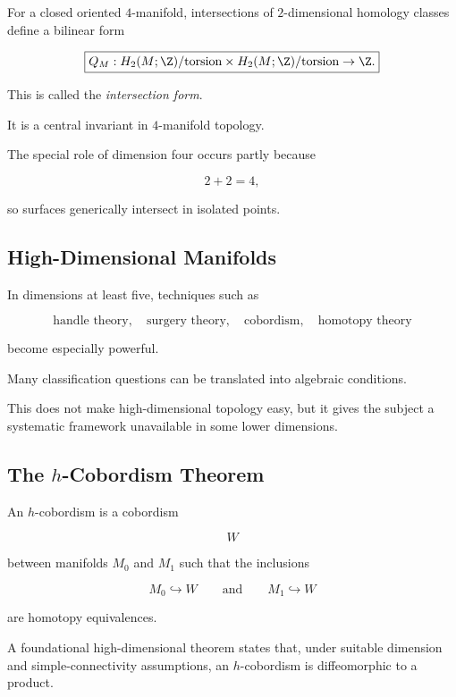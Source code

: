 For a closed oriented \(4\)-manifold, intersections of \(2\)-dimensional
homology classes define a bilinear form

\[
\boxed{
Q_M:
H_2(M;\Z)/\text{torsion}
\times
H_2(M;\Z)/\text{torsion}
\to
\Z.
}
\]

This is called the \emph{intersection form}.

It is a central invariant in \(4\)-manifold topology.

The special role of dimension four occurs partly because

\[
\boxed{
2+2=4,
}
\]

so surfaces generically intersect in isolated points.

\subsection{High-Dimensional Manifolds}
\label{subsec:high-dimensional-manifolds-geometric}

In dimensions at least five, techniques such as

\[
\boxed{
\text{handle theory},
\quad
\text{surgery theory},
\quad
\text{cobordism},
\quad
\text{homotopy theory}
}
\]

become especially powerful.

Many classification questions can be translated into algebraic conditions.

This does not make high-dimensional topology easy, but it gives the subject
a systematic framework unavailable in some lower dimensions.

\subsection{The \texorpdfstring{\(h\)}{h}-Cobordism Theorem}
\label{subsec:h-cobordism-theorem}

An \(h\)-cobordism is a cobordism

\[
W
\]

between manifolds \(M_0\) and \(M_1\) such that the inclusions

\[
M_0\hookrightarrow W
\qquad\text{and}\qquad
M_1\hookrightarrow W
\]

are homotopy equivalences.

A foundational high-dimensional theorem states that, under suitable
dimension and simple-connectivity assumptions, an \(h\)-cobordism is
diffeomorphic to a product.


